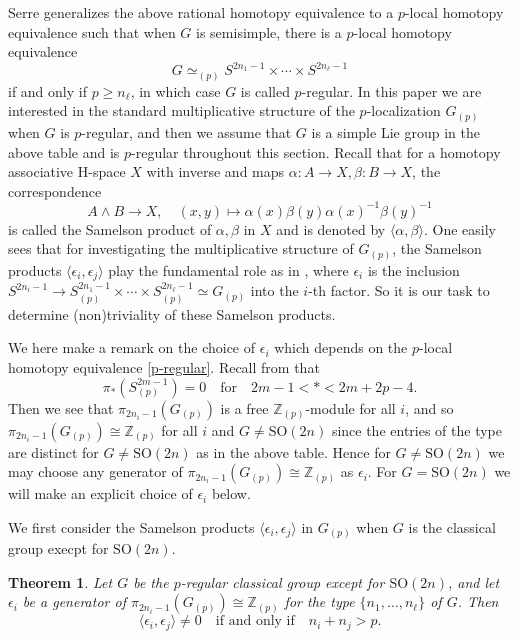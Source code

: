 \documentclass[12pt]{amsart}
\numberwithin{equation}{section}
\newtheorem{theorem}{Theorem}[section]
\theoremstyle{definition}
\theoremstyle{remark}
\begin{document}
\noindent Serre generalizes the above rational homotopy equivalence to a $p$-local homotopy equivalence such that when $G$ is semisimple, there is a $p$-local homotopy equivalence 
\begin{equation}
\label{p-regular}
G\simeq_{(p)}S^{2n_1-1}\times\cdots\times S^{2n_\ell-1}
\end{equation}
if and only if $p\ge n_\ell$, in which case $G$ is called $p$-regular. In this paper we are interested in the standard multiplicative structure of the $p$-localization $G_{(p)}$ when $G$ is $p$-regular, and then we assume that $G$ is a simple Lie group in the above table and is $p$-regular throughout this section. Recall that for a homotopy associative H-space $X$ with inverse and maps $\alpha:A\to X,\beta:B\to X$, the correspondence
$$A\wedge B\to X,\quad(x,y)\mapsto\alpha(x)\beta(y)\alpha(x)^{-1}\beta(y)^{-1}$$
is called the Samelson product of $\alpha,\beta$ in $X$ and is denoted by $\langle\alpha,\beta\rangle$. One easily sees that for investigating the multiplicative structure of $G_{(p)}$, the Samelson products $\langle\epsilon_i,\epsilon_j\rangle$ play the fundamental role as in \cite{KK}, where $\epsilon_i$ is the inclusion $S^{2n_i-1}\to S^{2n_1-1}_{(p)}\times\cdots\times S^{2n_\ell-1}_{(p)}\simeq G_{(p)}$ into the $i$-th factor. So it is our task to determine (non)triviality of these Samelson products. 

We here make a remark on the choice of $\epsilon_i$ which depends on the $p$-local homotopy equivalence \eqref{p-regular}. Recall from \cite[Theorem 13.4]{T} that 
\begin{equation}
\label{pi(S)}
\pi_*(S^{2m-1}_{(p)})=0\quad\text{for}\quad 2m-1<*<2m+2p-4.
\end{equation}
Then we see that $\pi_{2n_i-1}(G_{(p)})$ is a free ${\mathbb{Z}}_{(p)}$-module for all $i$, and so $\pi_{2n_i-1}(G_{(p)})\cong{\mathbb{Z}}_{(p)}$ for all $i$ and $G\ne{\mathrm{SO}}(2n)$ since the entries of the type are distinct for $G\ne{\mathrm{SO}}(2n)$ as in the above table. Hence for $G\ne{\mathrm{SO}}(2n)$ we may choose any generator of $\pi_{2n_i-1}(G_{(p)})\cong{\mathbb{Z}}_{(p)}$ as $\epsilon_i$. For $G={\mathrm{SO}}(2n)$ we will make an explicit choice of $\epsilon_i$ below.

We first consider the Samelson products $\langle\epsilon_i,\epsilon_j\rangle$ in $G_{(p)}$ when $G$ is the classical group execpt for ${\mathrm{SO}}(2n)$.

\begin{theorem}
\label{classical}
Let $G$ be the $p$-regular classical group except for ${\mathrm{SO}}(2n)$, and let $\epsilon_i$ be a generator of $\pi_{2n_i-1}(G_{(p)})\cong{\mathbb{Z}}_{(p)}$ for the type $\{n_1,\ldots,n_\ell\}$ of $G$. Then 
$$\langle\epsilon_i,\epsilon_j\rangle\ne 0\quad\text{if and only if}\quad n_i+n_j>p.$$
\end{theorem} 
\end{document}
